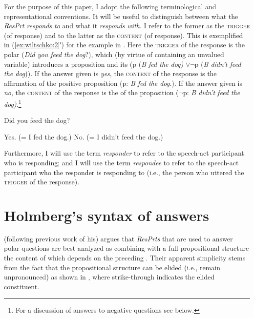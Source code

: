 \documentclass[output=paper]{LSP/langsci}
\begin{document}
For the purpose of this paper, I adopt the following terminological and representational conventions. It will be useful to distinguish between what the \textit{ResPrt} \textit{responds to} and what it \textit{responds with}. I refer to the former as the \textsc{trigger (}of response) and to the latter as the \textsc{content (}of response\textsc{).} This is exemplified in (\ref{ex:wiltschko:2}′) for the example in . Here the \textsc{trigger} of the response is the polar  (\textit{Did you feed the dog}?), which (by virtue of containing an unvalued  variable) introduces a proposition and its  (p (\textit{B fed the dog)} $\lor ¬$p (\textit{B didn’t feed the dog})). If the answer given is \textit{yes}, the \textsc{content} of the response is the affirmation of the positive proposition (p: \textit{B fed the dog.}). If the answer given is \textit{no}, the \textsc{content} of the response is the  of the proposition ($¬$p: \textit{B didn’t feed the dog)}.\footnote{For a discussion of answers to negative questions see  below.}  

\begin{exe}
\label{ex:wiltschko:2}\settowidth{}
\begin{xlist}
 Did you feed the dog?   
\begin{xlist}
         \exi{} Yes. (= I fed the dog.) 
         \exi{} No.  (= I didn’t feed the dog.)  
\end{xlist}
\end{xlist}
\end{exe}

\noindent Furthermore, I will use the term \textit{responder} to refer to the speech-act participant who is responding; and I will use the term \textit{respondee} to refer to the speech-act participant who the responder is responding to (i.e., the {person} who uttered the \textsc{trigger} of the response).

\section{Holmberg’s syntax of answers}\label{sec:wiltschko:2}

\citet{holmberg:15} (following previous work of his) argues that \textit{ResPrts} that are used to answer polar questions are best analyzed as combining with a full propositional structure the content of which depends on the preceding . Their apparent simplicity stems from the fact that the propositional structure can be elided (i.e., remain unpronounced) as shown in , where strike-through indicates the elided constituent. 
\end{document}
